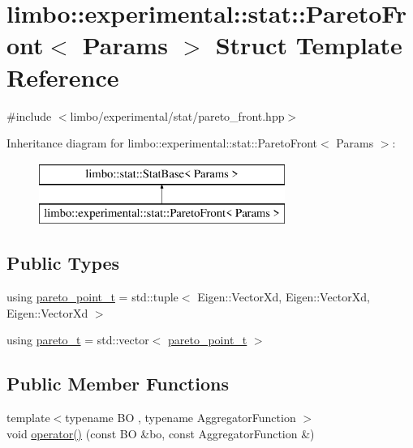 \hypertarget{structlimbo_1_1experimental_1_1stat_1_1_pareto_front}{}\section{limbo\+:\+:experimental\+:\+:stat\+:\+:Pareto\+Front$<$ Params $>$ Struct Template Reference}
\label{structlimbo_1_1experimental_1_1stat_1_1_pareto_front}


{\ttfamily \#include $<$limbo/experimental/stat/pareto\+\_\+front.\+hpp$>$}

Inheritance diagram for limbo\+:\+:experimental\+:\+:stat\+:\+:Pareto\+Front$<$ Params $>$\+:\begin{figure}[H]
\begin{center}
\leavevmode
\includegraphics[height=2.000000cm]{structlimbo_1_1experimental_1_1stat_1_1_pareto_front}
\end{center}
\end{figure}
\subsection*{Public Types}
\begin{DoxyCompactItemize}
\item 
using \hyperlink{structlimbo_1_1experimental_1_1stat_1_1_pareto_front_a2d872d2ad0a93b4c459bad640be158b9}{pareto\+\_\+point\+\_\+t} = std\+::tuple$<$ Eigen\+::\+Vector\+Xd, Eigen\+::\+Vector\+Xd, Eigen\+::\+Vector\+Xd $>$
\item 
using \hyperlink{structlimbo_1_1experimental_1_1stat_1_1_pareto_front_a710260d53bff65b4841c348b074a6e23}{pareto\+\_\+t} = std\+::vector$<$ \hyperlink{structlimbo_1_1experimental_1_1stat_1_1_pareto_front_a2d872d2ad0a93b4c459bad640be158b9}{pareto\+\_\+point\+\_\+t} $>$
\end{DoxyCompactItemize}
\subsection*{Public Member Functions}
\begin{DoxyCompactItemize}
\item 
{\footnotesize template$<$typename BO , typename Aggregator\+Function $>$ }\\void \hyperlink{structlimbo_1_1experimental_1_1stat_1_1_pareto_front_a341b34d96290a874818bbdb4f27f9f2b}{operator()} (const BO \&bo, const Aggregator\+Function \&)
\end{DoxyCompactItemize}


